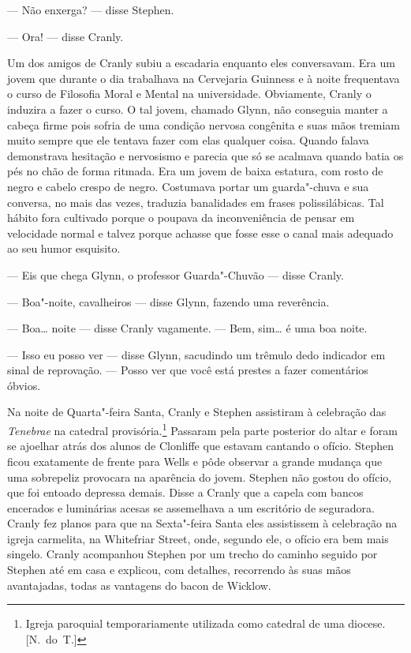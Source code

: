 --- Não enxerga? --- disse Stephen.

--- Ora! --- disse Cranly.

Um dos amigos de Cranly subiu a escadaria enquanto eles conversavam.  Era um
jovem que durante o dia trabalhava na Cervejaria Guinness e à noite frequentava
o curso de Filosofia Moral e Mental na universidade.  Obviamente, Cranly o
induzira a fazer o curso.  O tal jovem, chamado Glynn, não conseguia manter a
cabeça firme pois sofria de uma condição nervosa congênita e suas mãos tremiam
muito sempre que ele tentava fazer com elas qualquer coisa.  Quando falava
demonstrava hesitação e nervosismo e parecia que só se acalmava quando batia os
pés no chão de forma ritmada.  Era um jovem de baixa estatura, com rosto de
negro e cabelo crespo de negro.  Costumava portar um guarda"-chuva e sua
conversa, no mais das vezes, traduzia banalidades em frases polissilábicas.
Tal hábito fora cultivado porque o poupava da inconveniência de pensar em
velocidade normal e talvez porque achasse que fosse esse o canal mais adequado
ao seu humor esquisito.

--- Eis que chega Glynn, o professor Guarda"-Chuvão --- disse Cranly.

--- Boa"-noite, cavalheiros --- disse Glynn, fazendo uma reverência.

--- Boa\ldots{} noite --- disse Cranly vagamente.  --- Bem, sim\ldots{} é uma boa noite.

--- Isso eu posso ver --- disse Glynn, sacudindo um trêmulo dedo indicador em
sinal de reprovação.  --- Posso ver que você está prestes a fazer comentários
óbvios.

Na noite de Quarta"-feira Santa, Cranly e Stephen assistiram à celebração das
\textit{Tenebrae} na catedral provisória.\footnote{ Igreja paroquial temporariamente		
utilizada como catedral de uma diocese. [N.~do~T.]}  Passaram pela parte
posterior do altar e foram se ajoelhar atrás dos alunos de Clonliffe que
estavam cantando o ofício.  Stephen ficou exatamente de frente para Wells e
pôde observar a grande mudança que uma sobrepeliz provocara na aparência do
jovem.  Stephen não gostou do ofício, que foi entoado depressa demais.  Disse a
Cranly que a capela com bancos encerados e luminárias acesas se assemelhava a
um escritório de seguradora.  Cranly fez planos para que na Sexta"-feira Santa
eles assistissem à celebração na igreja carmelita, na Whitefriar Street, onde,
segundo ele, o ofício era bem mais singelo.  Cranly acompanhou Stephen por um
trecho do caminho seguido por Stephen até em casa e explicou, com detalhes,
recorrendo às suas mãos avantajadas, todas as vantagens do bacon de Wicklow.

